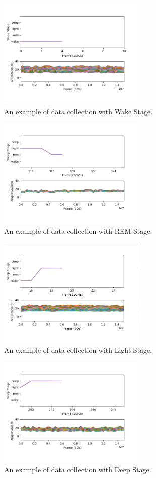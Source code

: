 \documentclass[10pt,letterpaper]{article}
\begin{document}
	
	\begin{figure}[htbp]
		\centerline{\includegraphics[width=70mm,scale=0.2]{VIS05.png}}
		\caption{An example of data collection with Wake Stage.}
		\label{fig:dataCollect01}
	\end{figure}
	\begin{figure}[htbp]
		\centerline{\includegraphics[width=70mm,scale=0.2]{VIS06.png}}
		\caption{An example of data collection with REM Stage.}
		\label{fig:dataCollect02}
	\end{figure}
	\begin{figure}[htbp]
		\centerline{\includegraphics[width=70mm,scale=0.2]{VIS07.png}}
		\caption{An example of data collection with Light Stage.}
		\label{fig:dataCollect03}
	\end{figure}
	\begin{figure}[htbp]
		\centerline{\includegraphics[width=70mm,scale=0.2]{VIS08.png}}
		\caption{An example of data collection with Deep Stage.}
		\label{fig:dataCollect04}
	\end{figure}
	
\end{document}
